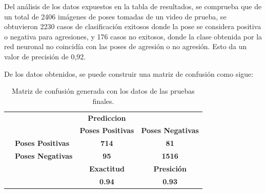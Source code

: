 \documentclass[a4paper,12pt,oneside,spanish]{book}
\begin{document}
Del análisis de los datos expuestos en la tabla de resultados, se comprueba que de un total de 2406 imágenes de poses tomadas de un video de prueba, se obtuvieron 2230 casos de clasificación exitosos donde la pose se considera positiva o negativa para agresiones, y 176 casos no exitosos, donde la clase obtenida por la red neuronal no coincidía con las poses de agresión o no agresión. Esto da un valor de precisión de 0,92.\par

De los datos obtenidos, se puede construir una matriz de confusión como sigue:\par
\vspace*{1cm}
\begin{table}[htbp]
	\centering
	\footnotesize
	\begin{tabular}{rrcc}
		\rowcolor[rgb]{ .827,  .953,  .988} \textcolor[rgb]{ .729,  .71,  .671}{} & \multicolumn{3}{c}{\cellcolor[rgb]{ .886,  .984,  .984}\textcolor[rgb]{ .729,  .71,  .671}{\textbf{Prediccion}}} \\[1ex]
		\rowcolor[rgb]{ .827,  .953,  .988} \textcolor[rgb]{ .729,  .71,  .671}{} & \textcolor[rgb]{ .255,  .243,  .212}{} & \multicolumn{1}{p{5.355em}}{\cellcolor[rgb]{ .784,  .941,  .984}\textcolor[rgb]{ .255,  .243,  .212}{\textbf{Poses Positivas}}} & \multicolumn{1}{p{5.355em}}{\cellcolor[rgb]{ .784,  .941,  .984}\textcolor[rgb]{ .255,  .243,  .212}{\textbf{Poses Negativas}}} \\[2ex]
		\rowcolor[rgb]{ .827,  .953,  .988} \multicolumn{1}{c}{\multirow{2}[0]{*}{\textcolor[rgb]{ .729,  .71,  .671}{\rotatebox{90}{\textbf{Real}}}}} & \multicolumn{1}{l}{\textcolor[rgb]{ .255,  .243,  .212}{\textbf{Poses Positivas}}} & \cellcolor[rgb]{ 1,  1,  1}\textcolor[rgb]{ .255,  .243,  .212}{\textbf{714}} & \cellcolor[rgb]{ 1,  1,  1}\textcolor[rgb]{ .255,  .243,  .212}{\textbf{81}} \\[2ex]
		\rowcolor[rgb]{ .827,  .953,  .988}       & \multicolumn{1}{l}{\textcolor[rgb]{ .255,  .243,  .212}{\textbf{Poses Negativas}}} & \cellcolor[rgb]{ 1,  1,  1}\textcolor[rgb]{ .255,  .243,  .212}{\textbf{95}} & \cellcolor[rgb]{ 1,  1,  1}\textcolor[rgb]{ .255,  .243,  .212}{\textbf{1516}} \\[2ex]
		\rowcolor[rgb]{ .827,  .953,  .988}       & \textcolor[rgb]{ .255,  .243,  .212}{} & \textcolor[rgb]{ .255,  .243,  .212}{\textbf{Exactitud}} & \textcolor[rgb]{ .255,  .243,  .212}{\textbf{Presición}} \\[1ex]
		\rowcolor[rgb]{ .827,  .953,  .988}  	  & \textcolor[rgb]{ .729,  .71,  .671}{} & \cellcolor[rgb]{ 1,  1,  1}\textcolor[rgb]{ .729,  .71,  .671}{\textbf{0.94}} & \cellcolor[rgb]{ 1,  1,  1}\textcolor[rgb]{ .729,  .71,  .671}{\textbf{0.93}} \\[1ex]
	\end{tabular}%
	\caption{Matriz de confusión generada con los datos de las pruebas finales.}
	\label{tab:addlabel}%
\end{table}%
\end{document}
